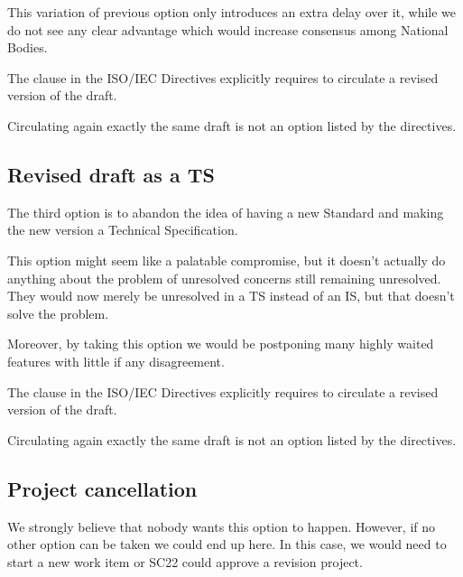 This variation of previous option only introduces an extra delay over it, while
we do not see any clear advantage which would increase consensus among National
Bodies.

\vspace{1em}
\begin{tcolorbox}[
  colback=orange!8!white,
  colframe=orange,
  title={\textbf{Important Observation}},
  breakable,
  width=\textwidth,
  boxrule=0.5pt
  ]
The clause in the ISO/IEC Directives explicitly requires to circulate a revised
version of the draft. 

Circulating again exactly the same draft is not an option listed by the
directives.
\end{tcolorbox}
\vspace{1em}

\subsection{Revised draft as a TS}

The third option is to abandon the idea of having a new Standard and making the
new version a Technical Specification. 

This option might seem like a palatable compromise, but it doesn't actually do
anything about the problem of unresolved concerns still remaining unresolved.
They would now merely be unresolved in a TS instead of an IS, but that doesn't
solve the problem.

Moreover, by taking this option we would be postponing many highly waited
features with little if any disagreement.

\vspace{1em}
\begin{tcolorbox}[
  colback=orange!8!white,
  colframe=orange,
  title={\textbf{Important Observation}},
  breakable,
  width=\textwidth,
  boxrule=0.5pt
  ]
The clause in the ISO/IEC Directives explicitly requires to circulate a revised
version of the draft. 

Circulating again exactly the same draft is not an option listed by the
directives.
\end{tcolorbox}
\vspace{1em}
\subsection{Project cancellation}

We strongly believe that nobody wants this option to happen. However, if no
other option can be taken we could end up here. In this case, we would need to
start a new work item or SC22 could approve a revision project.

